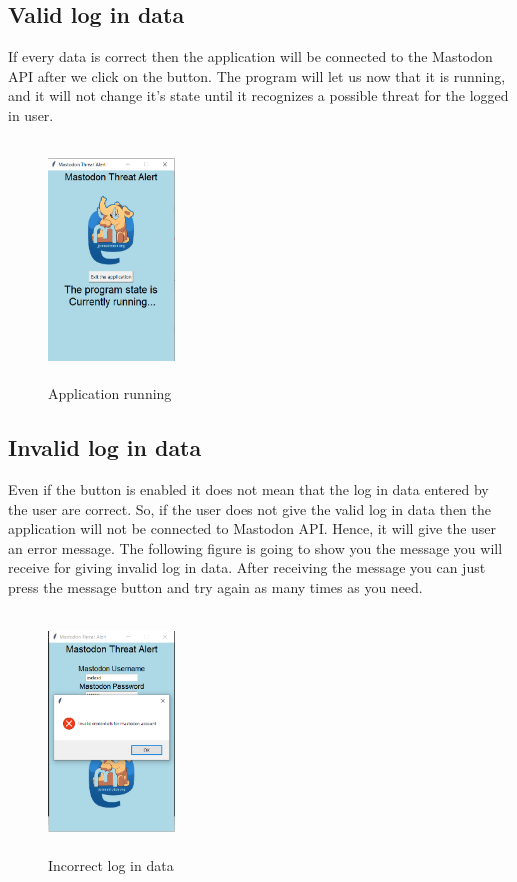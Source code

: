 \subsection{Valid log in data}
\label{ss:correct_data}
If every data is correct then the application will be connected to the Mastodon API after
we click on the button. The program will let us now that it is running, and it will not
change it's state until it recognizes a possible threat for the logged in user.
\begin{figure}[H]
	\centering
	\includegraphics[width=0.3\textwidth,height=240px]{images/runningapp.png}
	\caption{Application running}
	\label{fig:running_app}
\end{figure}

\subsection{Invalid log in data}
\label{ss:incorrect_data}
Even if the button is enabled it does not mean that the log in data entered by the user
are correct. So, if the user does not give the valid log in data then the application 
will not be connected to Mastodon API. Hence, it will give the user an error message.
The following figure is going to show you the message you will receive for giving invalid 
log in data. After receiving the message you can just press the message button and try again
as many times as you need.
\begin{figure}[H]
	\centering
	\includegraphics[width=0.3\textwidth,height=240px]{images/invalidred.png}
	\caption{Incorrect log in data}
	\label{fig:invalid_data}
\end{figure}

